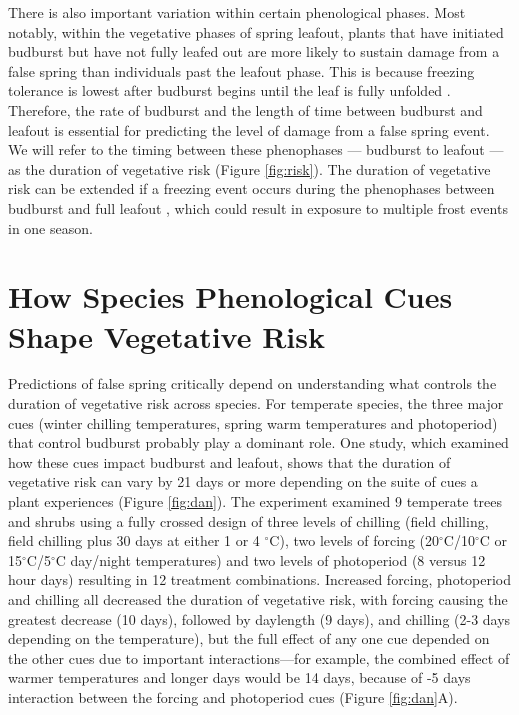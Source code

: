 \documentclass{article}\usepackage[]{graphicx}\usepackage[]{color}
\begin{document}
There is also important variation within certain phenological phases. Most notably, within the vegetative phases of spring leafout, plants that have initiated budburst but have not fully leafed out are more likely to sustain damage from a false spring than individuals past the leafout phase. This is because freezing tolerance is lowest after budburst begins until the leaf is fully unfolded \citep{Lenz2016}. Therefore, the rate of budburst and the length of time between budburst and leafout is essential for predicting the level of damage from a false spring event. We will refer to the timing between these phenophases --- budburst to leafout --- as the duration of vegetative risk (Figure \ref{fig:risk}). The duration of vegetative risk can be extended if a freezing event occurs during the phenophases between budburst and full leafout \citep{Augspurger2009}, which could result in exposure to multiple frost events in one season.

\section {How Species Phenological Cues Shape Vegetative Risk}
Predictions of false spring critically depend on understanding what controls the duration of vegetative risk across species. For temperate species, the three major cues (winter chilling temperatures, spring warm temperatures and photoperiod) that control budburst \citep%
{Chuine2010} probably play a dominant role. One study, which examined how these cues impact budburst and leafout, shows that the duration of vegetative risk can vary by 21 days or more depending on the suite of cues a plant experiences (Figure \ref{fig:dan}). The experiment examined 9 temperate trees and shrubs using a fully crossed design of three levels of chilling (field chilling, field chilling plus 30 days at either 1 or 4 $^{\circ}$C), two levels of forcing (20$^{\circ}$C/10$^{\circ}$C or 15$^{\circ}$C/5$^{\circ}$C day/night temperatures) and two levels of photoperiod (8 versus 12 hour days) resulting in 12 treatment combinations. Increased forcing, photoperiod and chilling all decreased the duration of vegetative risk, with forcing causing the greatest decrease (10 days), followed by daylength (9 days), and chilling (2-3 days depending on the temperature), but the full effect of any one cue depended on the other cues due to important interactions---for example, the combined effect of warmer temperatures and longer days would be 14 days, because of -5 days interaction between the forcing and photoperiod cues (Figure \ref{fig:dan}A). 
\end{document}
